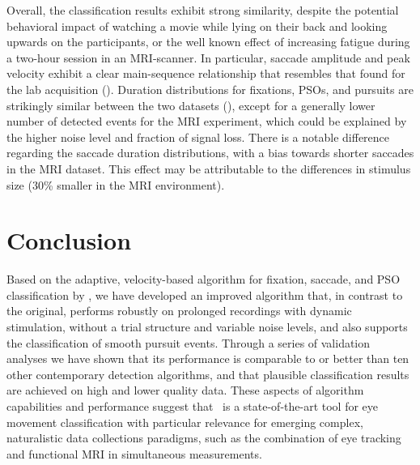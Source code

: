 
Overall, the classification results exhibit strong similarity, despite the potential
behavioral impact of watching a movie while lying on their back and looking
upwards on the participants, or the well known effect of increasing fatigue \citep{wakefulness}
during a two-hour session in an MRI-scanner. In particular, saccade amplitude
and peak velocity exhibit a clear main-sequence relationship that resembles
that found for the lab acquisition (). Duration distributions
for fixations, PSOs, and pursuits are strikingly similar between the two
datasets (), except for a generally lower number of detected events
for the MRI experiment, which could be explained by the higher noise level and
fraction of signal loss. There is a notable difference regarding the saccade
duration distributions, with a bias towards shorter saccades in the MRI
dataset. This effect may be attributable to the differences in stimulus size
(30\% smaller in the MRI environment).


\section*{Conclusion}\label{con}

Based on the adaptive, velocity-based algorithm for fixation, saccade, and PSO
classification by \cite{Nystrom2010AnData}, we have developed an improved algorithm
that, in contrast to the original, performs robustly on prolonged recordings
with dynamic stimulation, without a trial structure and variable noise levels,
and also supports the classification of smooth pursuit events. Through a series of
validation analyses we have shown that its performance is comparable to or
better than ten other contemporary detection algorithms, and that plausible
classification results are achieved on high and lower quality data.
These aspects of algorithm capabilities and performance suggest that \remodnav\
is a state-of-the-art tool for eye movement classification with particular relevance
for emerging complex, naturalistic data collections paradigms, such as
the combination of eye tracking and functional
MRI in simultaneous measurements.

